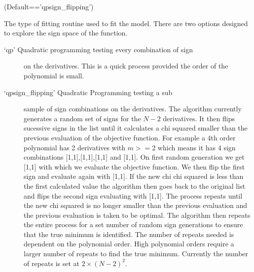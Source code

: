 \documentclass[letterpaper,10pt,english]{sphinxmanual}
\begin{document}
\begin{fulllineitems}
\label{\detokenize{source/maxsmooth:maxsmooth.settings.setting}}

 (Default==’qp\sphinxhyphen{}sign\_flipping’)

The type of fitting routine used to fit the model. There are two options
designed to explore the sign space of the function.

\begin{description}
\item[{‘qp’ \sphinxhyphen{} Quadratic programming testing every combination of sign}] \leavevmode
on the derivatives. This is a quick process provided the
order of the polynomial is small.

\item[{‘qp\sphinxhyphen{}sign\_flipping’ \sphinxhyphen{} Quadratic Programming testing a sub}] \leavevmode
sample of sign combinations on the derivatives. The
algorithm currently generates a random set of signs for
the \(N-2\) derivatives. It then flips sucessive signs in the
list until it calculates a chi squared smaller than the
previous evaluation of the objective function. For
example a 4th order polynomial has 2 derivatives with \(m>=2\)
which means it has 4 sign combinations {[}1,1{]},{[}\sphinxhyphen{}1,\sphinxhyphen{}1{]},{[}\sphinxhyphen{}1,1{]}
and {[}1,\sphinxhyphen{}1{]}. On first random generation we get {[}\sphinxhyphen{}1,1{]} with
which we evaluate the objective function. We then flip the
first sign and evaluate again with {[}1,1{]}. If the new chi chi squared
is less than the first calculated value the algorithm
then goes back to the original list and flips the second sign
evaluating with {[}\sphinxhyphen{}1,\sphinxhyphen{}1{]}. The process repeats until the new
chi squared is no longer smaller than the previous
evaluation and the previous evaluation is taken to be optimal.
The algorithm then repeats the entire process for a set number
of random sign generations to ensure that the
true minimum is identified. The number of repeats needed
is dependent on the polynomial order. High polynomial
orders require a larger number of repeats to find the true
minimum. Currently the number of repeats is set at
\({2\times(N-2)^2}\).

\end{description}


\end{fulllineitems}
\end{document}
